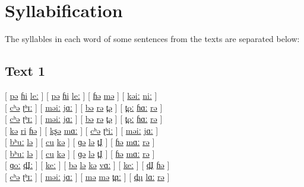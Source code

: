 \documentclass[17pt]{extarticle}
\begin{document}
\section*{\textbf{Syllabification}}

The syllables in each word of some sentences from the texts are separated below:

\subsection*{\textbf{Text 1}}

\hspace{0.7cm}[ \underline{pə} \underline{ɦi} \underline{leː} ] [ \underline{pə} \underline{ɦi} \underline{leː} ] [ \underline{ɦə} \underline{mə} ] [ \underline{kəiː} \underline{niː} ]\\

[ \underline{cʰə} \underline{ʈʰɪː} ] [ \underline{məiː} \underline{jɑː} ] [ \underline{bə} \underline{rə} \underline{t̪ə} ] [ \underline{t̪oː} \underline{ɦɑː} \underline{rə} ]\\

[ \underline{cʰə} \underline{ʈʰɪː} ] [ \underline{məiː} \underline{jɑː} ] [ \underline{bə} \underline{rə} \underline{t̪ə} ] [ \underline{t̪oː} \underline{ɦɑː} \underline{rə} ]\\

 [ \underline{kə} \underline{ri} \underline{ɦə} ] [ \underline{kʂə} \underline{mɑː} ] [ \underline{cʰə} \underline{ʈʰiː} ] [ \underline{məiː} \underline{jɑː} ]\\

[ \underline{bʰuː} \underline{lə} ] [ \underline{cu} \underline{kə} ] [ \underline{ɡə} \underline{lə} \underline{t̪I} ] [ \underline{ɦə} \underline{mɑː} \underline{rə} ]\\

[ \underline{bʰuː} \underline{lə} ] [ \underline{cu} \underline{kə} ] [ \underline{ɡə} \underline{lə} \underline{t̪I} ] [ \underline{ɦə} \underline{mɑː} \underline{rə} ]\\

 [ \underline{ɡoː} \underline{d̪Iː} ] [ \underline{keː} ] [ \underline{bə} \underline{lə} \underline{kə} \underline{vɑː} ] [ \underline{keː} ] [ \underline{d̪I} \underline{ɦə} ]\\

[ \underline{cʰə} \underline{ʈʰɪː} ] [ \underline{məiː} \underline{jɑː} ] [ \underline{mə} \underline{mə} \underline{t̪ɑː} ] [ \underline{d̪u} \underline{lɑː} \underline{rə} ]\\
\end{document}
